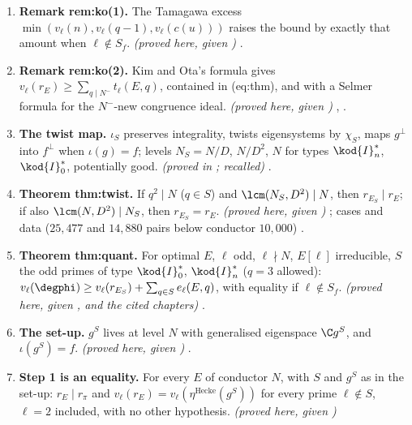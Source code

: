 \begin{enumerate}[label=\textbf{\thechapter.\arabic*}]
{)} ; examples (, ,  at $3$, all with $H^1_f=0$) .
\item \textbf{Remark rem:ko(1).} The Tamagawa excess $\min(v_\ell(n),v_\ell(q-1),v_\ell(c(u)))$ raises the bound by exactly that amount when $\ell\notin S_f$. \emph{(proved here, given )}
.
\item \textbf{Remark rem:ko(2).} Kim and Ota's formula gives $v_\ell(r_E)\ge\sum_{q\mid N^-}t_\ell(E,q)$, contained in (eq:thm), and with  a Selmer formula for the $N^-$-new congruence ideal.
\emph{(proved here, given \cite{KimOta})} , .
\item \textbf{The twist map.} $\iota_S$ preserves integrality, twists eigensystems by $\chi_S$, maps $g^\perp$ into $f^\perp$ when $\iota(g)=f$; levels $N_S=N/D$, $N/D^2$, $N$ for types $\kod{I}_n^*$, $\kod{I}_0^*$, potentially good.
\emph{(proved in ; recalled)} .
\item \textbf{Theorem thm:twist.} If $q^2\mid N$ ($q\in S$) and $\lcm(N_S,D^2)\mid N$, then $r_{E_S}\mid r_E$; if also $\lcm(N,D^2)\mid N_S$, then $r_{E_S}=r_E$. \emph{(proved here, given )}
; cases and data ($25{,}477$ and $14{,}880$ pairs below conductor $10{,}000$) .
\item \textbf{Theorem thm:quant.} For optimal $E$, $\ell$ odd, $\ell\nmid N$, $E[\ell]$ irreducible, $S$ the odd primes of type $\kod{I}_0^*$, $\kod{I}_n^*$ ($q=3$ allowed): $v_\ell(\degphi)\ge v_\ell(r_{E_S})+\sum_{q\in S}e_\ell(E,q)$, with
equality if $\ell\notin S_f$. \emph{(proved here, given ,  and the cited chapters)} .
\item \textbf{The set-up.} $g^S$ lives at level $N$ with generalised eigenspace $\C g^S$, and $\iota(g^S)=f$. \emph{(proved here, given )} .
\item \textbf{Step 1 is an equality.} For every $E$ of conductor $N$, with $S$ and $g^S$ as in the set-up: $r_E\mid r_\pi$ and $v_\ell(r_E)=v_\ell(\eta^{\mathrm{Hecke}}(g^S))$ for every prime $\ell\notin S$, $\ell=2$ included, with no other hypothesis. \emph{(proved here, given )}

\end{enumerate}
